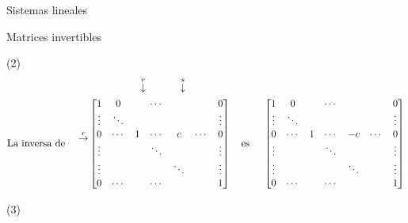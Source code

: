 \begin{chapter}{Sistemas lineales}
\begin{section}{Matrices invertibles}
\begin{ejemplo*}
            (2)
            \begin{align*}
            &\begin{matrix}
            {}^{}&{}^{}&{}^{}&{}^{}&{}^{}&\overset{r}{\downarrow}&{}^{}&{}^{}&{}^{}{}^{}\overset{s}{\downarrow}&{}^{}
            \end{matrix} \\
            \text{La inversa de \quad}\begin{matrix}
            {}^{}\\{}^{}\\
            \overset{r}{\to}\\
            {}^{}\\
            {}^{}\\
            {}^{}
            \end{matrix}
            &\begin{bmatrix}
            1 & 0 &  &\cdots &&& 0  \\
            \vdots  & \ddots  & & &&& \vdots \\
            0 & \cdots &1 &\cdots&c&\cdots &0 \\
            \vdots  &   & &\ddots &&& \vdots \\
            \vdots  &   & & &\ddots&& \vdots \\
            0  & \cdots  & &\cdots &&& 1
            \end{bmatrix}
            \text{\quad es \quad}
            \begin{bmatrix}
            1 & 0 &  &\cdots &&& 0  \\
            \vdots  & \ddots  & & &&& \vdots \\
            0 & \cdots &1 &\cdots&-c&\cdots &0 \\
            \vdots  &   & &\ddots &&& \vdots \\
            \vdots  &   & & &\ddots&& \vdots \\
            0  & \cdots  & &\cdots &&& 1
            \end{bmatrix}
            \end{align*}
            
            (3)
            

\end{ejemplo*}
\end{section}
\end{chapter}
